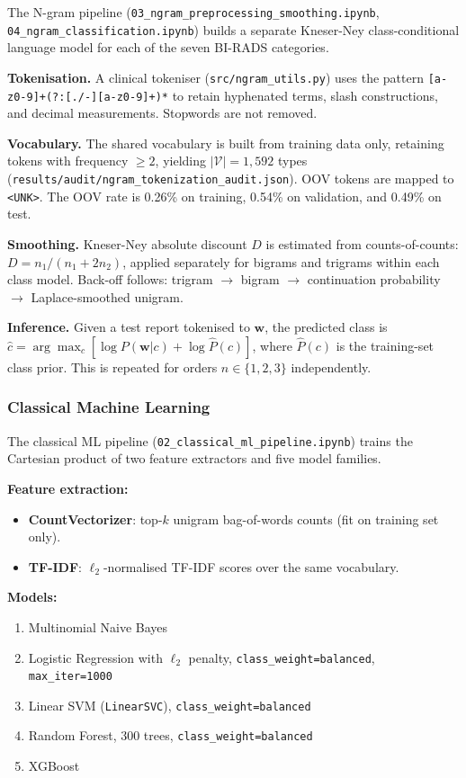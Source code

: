 \documentclass[11pt,a4paper]{article}
\begin{document}
The N-gram pipeline (\texttt{03\_ngram\_preprocessing\_smoothing.ipynb},
\texttt{04\_ngram\_classification.ipynb}) builds a separate Kneser-Ney
class-conditional language model for each of the seven BI-RADS categories.

\textbf{Tokenisation.}
A clinical tokeniser (\texttt{src/ngram\_utils.py}) uses the pattern
\verb|[a-z0-9]+(?:[./-][a-z0-9]+)*| to retain hyphenated terms, slash
constructions, and decimal measurements.
Stopwords are not removed.

\textbf{Vocabulary.}
The shared vocabulary is built from training data only, retaining tokens with
frequency $\geq 2$, yielding $|\mathcal{V}| = 1{,}592$ types
(\texttt{results/audit/ngram\_tokenization\_audit.json}).
OOV tokens are mapped to \texttt{<UNK>}.
The OOV rate is 0.26\% on training, 0.54\% on validation, and 0.49\% on test.

\textbf{Smoothing.}
Kneser-Ney absolute discount $D$ is estimated from counts-of-counts:
$D = n_1 / (n_1 + 2n_2)$, applied separately for bigrams and trigrams within
each class model.
Back-off follows: trigram $\to$ bigram $\to$ continuation probability $\to$
Laplace-smoothed unigram.

\textbf{Inference.}
Given a test report tokenised to $\mathbf{w}$, the predicted class is
$\hat{c} = \arg\max_c [\log P(\mathbf{w}|c) + \log \hat{P}(c)]$,
where $\hat{P}(c)$ is the training-set class prior.
This is repeated for orders $n \in \{1, 2, 3\}$ independently.

\subsubsection{Classical Machine Learning}

The classical ML pipeline (\texttt{02\_classical\_ml\_pipeline.ipynb}) trains
the Cartesian product of two feature extractors and five model families.

\textbf{Feature extraction:}
\begin{itemize}
  \item \textbf{CountVectorizer}: top-$k$ unigram bag-of-words counts
        (fit on training set only).
  \item \textbf{TF-IDF}: $\ell_2$-normalised TF-IDF scores over the same
        vocabulary.
\end{itemize}

\textbf{Models:}
\begin{enumerate}
  \item Multinomial Naive Bayes
  \item Logistic Regression with $\ell_2$ penalty, \texttt{class\_weight=balanced},
        \texttt{max\_iter=1000}
  \item Linear SVM (\texttt{LinearSVC}), \texttt{class\_weight=balanced}
  \item Random Forest, 300 trees, \texttt{class\_weight=balanced}
  \item XGBoost
\end{enumerate}
\end{document}
